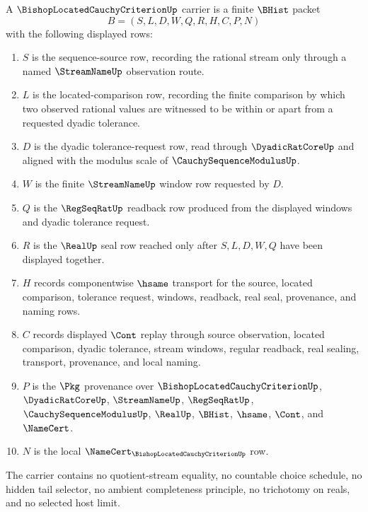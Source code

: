 \begin{definition}
\label{def:bishop-located-cauchy-criterion-carrier}
A $\BishopLocatedCauchyCriterionUp$ carrier is a finite $\BHist$ packet
$$
B=(S,L,D,W,Q,R,H,C,P,N)
$$
with the following displayed rows:
\begin{enumerate}
\item $S$ is the sequence-source row, recording the rational stream only through a named $\StreamNameUp$ observation route.
\item $L$ is the located-comparison row, recording the finite comparison by which two observed rational values are witnessed to be within or apart from a requested dyadic tolerance.
\item $D$ is the dyadic tolerance-request row, read through $\DyadicRatCoreUp$ and aligned with the modulus scale of $\CauchySequenceModulusUp$.
\item $W$ is the finite $\StreamNameUp$ window row requested by $D$.
\item $Q$ is the $\RegSeqRatUp$ readback row produced from the displayed windows and dyadic tolerance request.
\item $R$ is the $\RealUp$ seal row reached only after $S,L,D,W,Q$ have been displayed together.
\item $H$ records componentwise $\hsame$ transport for the source, located comparison, tolerance request, windows, readback, real seal, provenance, and naming rows.
\item $C$ records displayed $\Cont$ replay through source observation, located comparison, dyadic tolerance, stream windows, regular readback, real sealing, transport, provenance, and local naming.
\item $P$ is the $\Pkg$ provenance over $\BishopLocatedCauchyCriterionUp$, $\DyadicRatCoreUp$, $\StreamNameUp$, $\RegSeqRatUp$, $\CauchySequenceModulusUp$, $\RealUp$, $\BHist$, $\hsame$, $\Cont$, and $\NameCert$.
\item $N$ is the local $\NameCert_{\BishopLocatedCauchyCriterionUp}$ row.
\end{enumerate}
The carrier contains no quotient-stream equality, no countable choice schedule, no hidden tail selector, no ambient completeness principle, no trichotomy on reals, and no selected host limit.
\end{definition}


